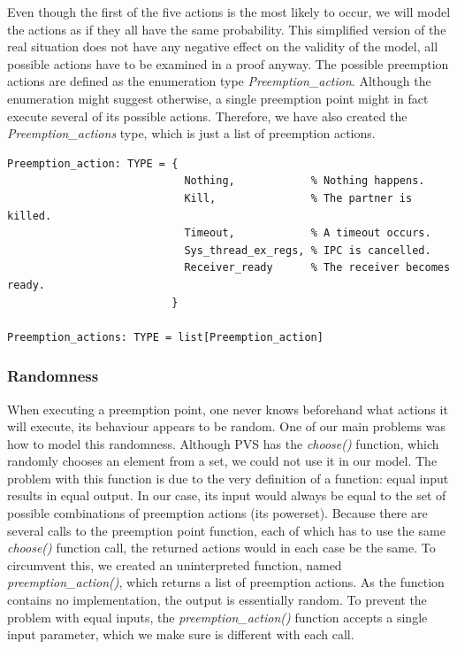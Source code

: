 Even though the first of the five actions is the most likely to occur, we will model the actions as if they all have the same probability. This simplified version of the real situation does not have any negative effect on the validity of the model, all possible actions have to be examined in a proof anyway. The possible preemption actions are defined as the enumeration type \emph{Preemption\_action}. Although the enumeration might suggest otherwise, a single preemption point might in fact execute several of its possible actions. Therefore, we have also created the \emph{Preemption\_actions} type, which is just a list of preemption actions.

\lstset{language=PVS}
\begin{lstlisting}[caption={PVS: \emph{preemption\_action} type.}]
% Enumeration of the possible preemption actions.
Preemption_action: TYPE = {
                            Nothing,            % Nothing happens.
                            Kill,               % The partner is killed.
                            Timeout,            % A timeout occurs.
                            Sys_thread_ex_regs, % IPC is cancelled.
                            Receiver_ready      % The receiver becomes ready.
                          }
                          
Preemption_actions: TYPE = list[Preemption_action]
\end{lstlisting}

\subsubsection{Randomness}
When executing a preemption point, one never knows beforehand what actions it will execute, its behaviour appears to be random. One of our main problems was how to model this randomness. Although PVS has the \emph{choose()} function, which randomly chooses an element from a set, we could not use it in our model. The problem with this function is due to the very definition of a function: equal input results in equal output. In our case, its input would always be equal to the set of possible combinations of preemption actions (its powerset). Because there are several calls to the preemption point function, each of which has to use the same \emph{choose()} function call, the returned actions would in each case be the same. To circumvent this, we created an uninterpreted function, named \emph{preemption\_action()}, which returns a list of preemption actions. As the function contains no implementation, the output is essentially random. To prevent the problem with equal inputs, the \emph{preemption\_action()} function accepts a single input parameter, which we make sure is different with each call.

